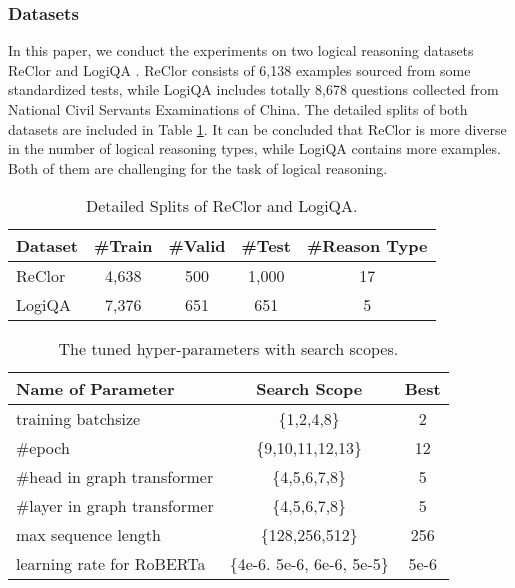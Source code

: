 \documentclass[sigconf]{acmart}
\begin{document}
\subsubsection{\textbf{Datasets}}
In this paper, we conduct the experiments on two logical reasoning datasets ReClor \cite{yu2019reclor} and LogiQA \cite{liu2020logiqa}. ReClor consists of 6,138 examples sourced from some standardized tests, while LogiQA includes totally 8,678 questions collected from National Civil Servants Examinations of China. The detailed splits of both datasets are included in Table \ref{dataset}. It can be concluded that ReClor is more diverse in the number of logical reasoning types, while LogiQA contains more examples. Both of them are challenging for the task of logical reasoning.

\begin{table}[t]
	\centering
	\caption{Detailed Splits of ReClor and LogiQA.}
	\vspace{-0.3cm}
	\begin{tabular}{p{1.7cm}|cccc}
		\toprule
		\textbf{Dataset} &\textbf{\#Train} &\textbf{\#Valid} &\textbf{\#Test} &\textbf{\#Reason Type}\\
		\hline
		ReClor & 4,638 &500 &1,000 &17\\
		LogiQA & 7,376 &651 &651 &5\\
		\bottomrule
	\end{tabular}
	\label{dataset}
	\vspace{-0.2cm}
\end{table}

\begin{table}[t]
	\caption{The tuned hyper-parameters with search scopes.}
	\vspace{-0.3cm}
	\centering
	\begin{tabular}{p{3.8cm}|cc}
		\toprule
		\textbf{Name of Parameter} & \textbf{Search Scope} & \textbf{Best}\\
		\hline
		training batchsize &\{1,2,4,8\} &2 \\
		\#epoch &\{9,10,11,12,13\} &12 \\
		\#head in graph transformer &\{4,5,6,7,8\} &5\\
		\#layer in graph transformer &\{4,5,6,7,8\} &5\\
		max sequence length &\{128,256,512\} &256 \\
		learning rate for RoBERTa &\{4e-6. 5e-6, 6e-6, 5e-5\} &5e-6 \\
		\bottomrule
	\end{tabular}
	\label{tab:hyper}
	\vspace{-0.3cm}
\end{table}
\end{document}
